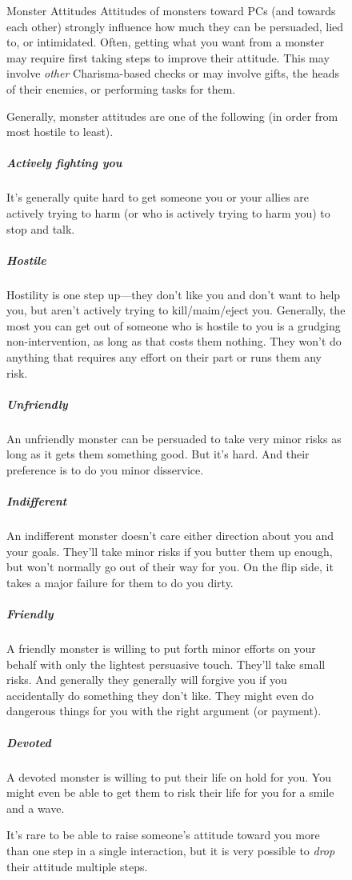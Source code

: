 \begin{figure}
    \begin{DndComment}{Monster Attitudes}
        Attitudes of monsters toward PCs (and towards each other) strongly influence how much they can be persuaded, lied to, or intimidated. Often, getting what you want from a monster may require first taking steps to improve their attitude. This may involve \textit{other} Charisma-based checks or may involve gifts, the heads of their enemies, or performing tasks for them.

        Generally, monster attitudes are one of the following (in order from most hostile to least).
        \subparagraph*{Actively fighting you} It's generally quite hard to get someone you or your allies are actively trying to harm (or who is actively trying to harm you) to stop and talk.
        \subparagraph*{Hostile} Hostility is one step up---they don't like you and don't want to help you, but aren't actively trying to kill/maim/eject you. Generally, the most you can get out of someone who is hostile to you is a grudging non-intervention, as long as that costs them nothing. They won't do anything that requires any effort on their part or runs them any risk.
        \subparagraph*{Unfriendly} An unfriendly monster can be persuaded to take very minor risks as long as it gets them something good. But it's hard. And their preference is to do you minor disservice.
        \subparagraph*{Indifferent} An indifferent monster doesn't care either direction about you and your goals. They'll take minor risks if you butter them up enough, but won't normally go out of their way for you. On the flip side, it takes a major failure for them to do you dirty.
        \subparagraph*{Friendly} A friendly monster is willing to put forth minor efforts on your behalf with only the lightest persuasive touch. They'll take small risks. And generally they generally will forgive you if you accidentally do something they don't like. They might even do dangerous things for you with the right argument (or payment).
        \subparagraph*{Devoted} A devoted monster is willing to put their life on hold for you. You might even be able to get them to risk their life for you for a smile and a wave.

        It's rare to be able to raise someone's attitude toward you more than one step in a single interaction, but it is very possible to \textit{drop} their attitude multiple steps.
    \end{DndComment}
\end{figure}

